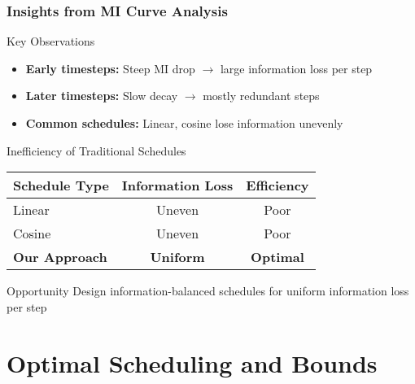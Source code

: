 \documentclass[aspectratio=169]{beamer}
\begin{document}
\begin{frame}
\frametitle{Insights from MI Curve Analysis}
\begin{block}{Key Observations}
\begin{itemize}
\item \textbf{Early timesteps:} Steep MI drop $\rightarrow$ large information loss per step
\item \textbf{Later timesteps:} Slow decay $\rightarrow$ mostly redundant steps
\item \textbf{Common schedules:} Linear, cosine lose information unevenly
\end{itemize}
\end{block}

\begin{block}{Inefficiency of Traditional Schedules}
\begin{center}
\begin{tabular}{|l|c|c|}
\hline
\textbf{Schedule Type} & \textbf{Information Loss} & \textbf{Efficiency} \\
\hline
Linear & Uneven & Poor \\
Cosine & Uneven & Poor \\
\textbf{Our Approach} & \textbf{Uniform} & \textbf{Optimal} \\
\hline
\end{tabular}
\end{center}
\end{block}

\begin{alertblock}{Opportunity}
Design information-balanced schedules for uniform information loss per step
\end{alertblock}
\end{frame}

\section{Optimal Scheduling and Bounds}
\end{document}
